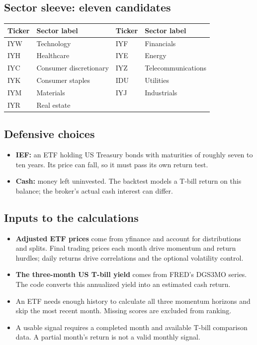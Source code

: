 \documentclass[11pt,letterpaper]{article}
\newcommand{\topic}[1]{\Needspace{5\baselineskip}\subsection*{#1}}
\begin{document}
\topic{Sector sleeve: eleven candidates}
\begin{center}
\begin{tabularx}{0.95\linewidth}{@{}lXlX@{}}
\toprule
\textbf{Ticker} & \textbf{Sector label} & \textbf{Ticker} & \textbf{Sector label}\\
\midrule
IYW & Technology & IYF & Financials\\
IYH & Healthcare & IYE & Energy\\
IYC & Consumer discretionary & IYZ & Telecommunications\\
IYK & Consumer staples & IDU & Utilities\\
IYM & Materials & IYJ & Industrials\\
IYR & Real estate & & \\
\bottomrule
\end{tabularx}
\end{center}

\topic{Defensive choices}
\begin{itemize}
\item \textbf{IEF:} an ETF holding US Treasury bonds with maturities of roughly seven to ten years. Its price can fall, so it must pass its own return test.
\item \textbf{Cash:} money left uninvested. The backtest models a T-bill return on this balance; the broker's actual cash interest can differ.
\end{itemize}

\topic{Inputs to the calculations}
\begin{itemize}
\item \textbf{Adjusted ETF prices} come from yfinance and account for distributions and splits. Final trading prices each month drive momentum and return hurdles; daily returns drive correlations and the optional volatility control.
\item \textbf{The three-month US T-bill yield} comes from FRED's DGS3MO series. The code converts this annualized yield into an estimated cash return.
\item An ETF needs enough history to calculate all three momentum horizons and skip the most recent month. Missing scores are excluded from ranking.
\item A usable signal requires a completed month and available T-bill comparison data. A partial month's return is not a valid monthly signal.
\end{itemize}
\end{document}
